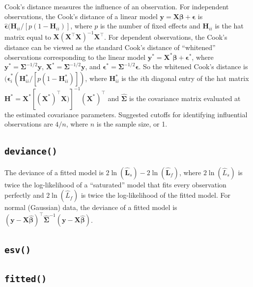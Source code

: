 \documentclass{article}
\begin{document}
Cook's distance measures the influence of an observation. For
independent observations, the Cook's distance of a linear model
\(\mathbf{y} = \mathbf{X} \boldsymbol{\beta} + \boldsymbol{\epsilon}\)
is
\(\hat{\boldsymbol{\epsilon}} (\mathbf{H}_{ii} / [p(1 - \mathbf{H}_{ii})]\),
where \(p\) is the number of fixed effects and \(\mathbf{H}_{ii}\) is
the hat matrix equal to
\(\mathbf{X} (\mathbf{X}^\intercal \mathbf{X})^{-1} \mathbf{X}^\intercal\).
For dependent observations, the Cook's distance can be viewed as the
standard Cook's distance of ``whitened'' observations corresponding to
the linear model
\(\mathbf{y}^* = \mathbf{X}^* \boldsymbol{\beta} + \boldsymbol{\epsilon}^*\),
where \(\mathbf{y}^* = \boldsymbol{\Sigma}^{-1/2} \mathbf{y}\),
\(\mathbf{X}^* = \boldsymbol{\Sigma}^{-1/2} \mathbf{y}\), and
\(\boldsymbol{\epsilon}^* = \boldsymbol{\Sigma}^{-1/2} \boldsymbol{\epsilon}\).
So the whitened Cook's distance is
\((\hat{\boldsymbol{\epsilon}}^*_i (\mathbf{H}^*_{ii} / [p(1 - \mathbf{H}^*_{ii})])\),
where \(\mathbf{H}^*_{ii}\) is the \(i\)th diagonal entry of the hat
matrix
\(\mathbf{H}^* = \mathbf{X}^* [(\mathbf{X}^*)^\intercal \mathbf{X})]^{-1} (\mathbf{X}^*)^\intercal\)
and \(\hat{\boldsymbol{\Sigma}}\) is the covariance matrix evaluated at
the estimated covariance parameters. Suggested cutoffs for identifying
influential observations are \(4 / n\), where \(n\) is the sample size,
or 1.

\hypertarget{deviance}{%
\subsection{\texorpdfstring{\texttt{deviance()}}{deviance()}}\label{deviance}}

The deviance of a fitted model is
\(2\ln(\hat{\mathbf{L}}_s) - 2\ln(\hat{\mathbf{L}}_f)\), where
\(2\ln(\hat{L}_s)\) is twice the log-likelihood of a ``saturated'' model
that fits every observation perfectly and \(2\ln(\hat{L}_f)\) is twice
the log-likelihood of the fitted model. For normal (Gaussian) data, the
deviance of a fitted model is
\((\mathbf{y} - \mathbf{X} \hat{\boldsymbol{\beta}})^\intercal \hat{\boldsymbol{\Sigma}}^{-1} (\mathbf{y} - \mathbf{X} \hat{\boldsymbol{\beta}})\).

\hypertarget{esv}{%
\subsection{\texorpdfstring{\texttt{esv()}}{esv()}}\label{esv}}

\hypertarget{fitted}{%
\subsection{\texorpdfstring{\texttt{fitted()}}{fitted()}}\label{fitted}}
\end{document}
